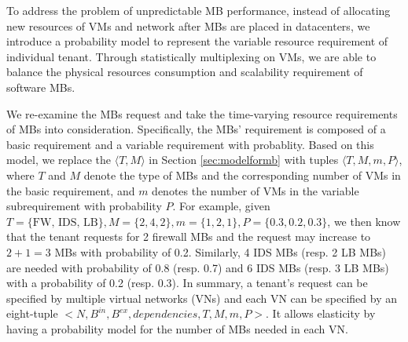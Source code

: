 \documentclass[10pt, conference, letterpaper]{IEEEtran}
\begin{document}
 










\appendix
To address the problem of unpredictable MB performance, instead of allocating new resources of VMs and network after MBs are placed in datacenters, we introduce a probability model to represent the variable resource requirement of individual tenant. Through statistically multiplexing on VMs, we are able to balance the physical resources consumption and scalability requirement of software MBs. 

We re-examine the MBs request and take the time-varying resource requirements of MBs into consideration. Specifically, the MBs' requirement is composed of a basic requirement and a variable requirement with probablity. Based on this model, we replace the $\langle T, M \rangle$ in Section \ref{sec:modelformb} with tuples $\langle T, M, m, P\rangle$, where $T$ and $M$  denote the type of MBs and the corresponding number of VMs in the basic requirement, and $m$ denotes the number of VMs in the variable subrequirement with probability $P$. For example, given $T=\{\text{FW, IDS, LB}\}, M=\{ 2, 4, 2\}, m=\{1, 2, 1\}, P=\{0.3, 0.2, 0.3\}$, we then know that the tenant requests for 2 firewall MBs and the request may increase to $2+1=3$ MBs with probability of 0.2. Similarly, 4 IDS MBs (resp. 2 LB MBs) are needed with probability of 0.8 (resp. 0.7) and 6 IDS MBs (resp. 3 LB MBs) with a probability of 0.2 (resp. 0.3). In summary, a tenant's request can be specified by multiple virtual networks (VNs) and each VN can be specified by an eight-tuple $<N, B^{in}, B^{ex}, dependencies, T, M, m, P>$. It allows elasticity by having a probability model for the number of MBs needed in each VN. 
\end{document}
